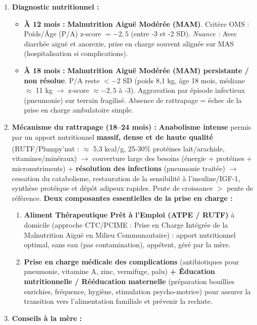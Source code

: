 \documentclass[11pt]{article}
\begin{document}
\begin{corrige}
\begin{enumerate}
    \item \textbf{Diagnostic nutritionnel :}
    \begin{itemize}
        \item \textbf{À 12 mois :} \textbf{Malnutrition Aiguë Modérée (MAM)}. Critère OMS : Poids/Âge (P/A) z-score $= -2,5$ (entre -3 et -2 SD). \textit{Nuance :} Avec diarrhée aiguë et anorexie, prise en charge souvent alignée sur MAS (hospitalisation si complications).
        \item \textbf{À 18 mois :} \textbf{Malnutrition Aiguë Modérée (MAM) persistante / non résolue}. P/A reste $< -2$ SD (poids 8,1 kg, âge 18 mois, médiane $\approx$ 11 kg $\rightarrow$ z-score $\approx -2,5$ à -3). Aggravation par épisode infectieux (pneumonie) sur terrain fragilisé. Absence de rattrapage = échec de la prise en charge ambulatoire simple.
    \end{itemize}
    \item \textbf{Mécanisme du rattrapage (18–24 mois) :} \textbf{Anabolisme intense} permis par un apport nutritionnel \textbf{massif, dense et de haute qualité} (RUTF/Plumpy'nut\textsuperscript{\textregistered} : $\approx$ 5,3 kcal/g, 25-30\% protéines lait/arachide, vitamines/minéraux) $\rightarrow$ couverture large des besoins (énergie + protéines + micronutriments) + \textbf{résolution des infections} (pneumonie traitée) $\rightarrow$ cessation du catabolisme, restauration de la sensibilité à l'insuline/IGF-1, synthèse protéique et dépôt adipeux rapides. Pente de croissance $>$ pente de référence.
    \textbf{Deux composantes essentielles de la prise en charge :}
    \begin{enumerate}
        \item \textbf{Aliment Thérapeutique Prêt à l'Emploi (ATPE / RUTF)} à domicile (approche CTC/PCIME : Prise en Charge Intégrée de la Malnutrition Aiguë en Milieu Communautaire) : apport nutritionnel optimal, sans eau (pas contamination), appétent, géré par la mère.
        \item \textbf{Prise en charge médicale des complications} (antibiotiques pour pneumonie, vitamine A, zinc, vermifuge, palu) \textbf{+ Éducation nutritionnelle / Rééducation maternelle} (préparation bouillies enrichies, fréquence, hygiène, stimulation psycho-motrice) pour assurer la transition vers l'alimentation familiale et prévenir la rechute.
    \end{enumerate}
    \item \textbf{Conseils à la mère :}
    \begin{itemize}

\end{itemize}
\end{enumerate}
\end{corrige}
\end{document}
